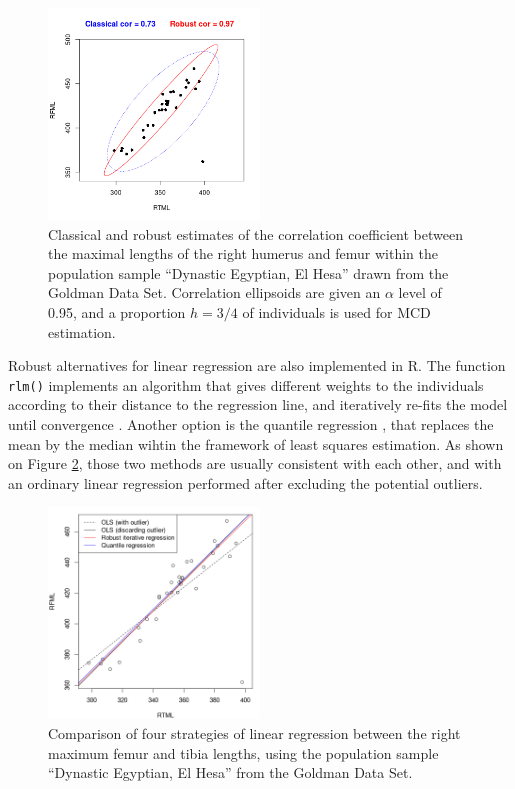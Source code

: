 \documentclass[review, 3p]{elsarticle}
\begin{document}
\begin{figure}[htbp]
\centering
\includegraphics[width=0.5\textwidth]{figures/robust-correlation.png}
\caption{\label{fig:orgbcf90ca}Classical and robust estimates of the correlation coefficient between the maximal lengths of the right humerus and femur within the population sample ``Dynastic Egyptian, El Hesa'' drawn from the Goldman Data Set. Correlation ellipsoids are given an \(\alpha\) level of 0.95, and a proportion \(h=3/4\) of individuals is used for MCD estimation.}
\end{figure}

Robust alternatives for linear regression are also implemented in R. The function \texttt{rlm()} implements an algorithm that gives different weights to the individuals according to their distance to the regression line, and iteratively re-fits the model until convergence \citep{venables2010_ModernAppliedStatistics}. Another option is the quantile regression \citep{koenker2005_QuantileRegressionRoger}, that replaces the mean by the median wihtin the framework of least squares estimation. As shown on Figure \ref{fig:org1ed38d9}, those two methods are usually consistent with each other, and with an ordinary linear regression performed after excluding the potential outliers.

\begin{figure}[htbp]
\centering
\includegraphics[width=0.5\textwidth]{figures/quantile-regression.png}
\caption{\label{fig:org1ed38d9}Comparison of four strategies of linear regression between the right maximum femur and tibia lengths, using the population sample ``Dynastic Egyptian, El Hesa'' from the Goldman Data Set.}
\end{figure}
\end{document}
